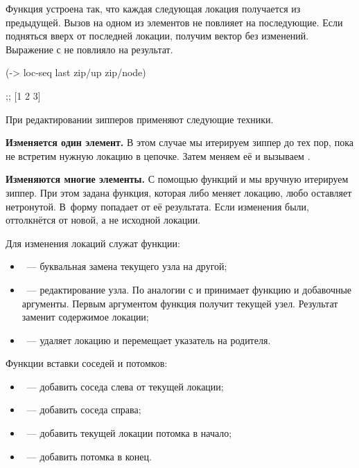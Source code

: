Функция  устроена так, что каждая следующая локация получается из
предыдущей. Вызов  на одном из элементов не повлияет на
последующие. Если подняться вверх от последней локации, получим вектор без
изменений. Выражение с  не повлияло на результат.

\begin{english}
  \begin{clojure}
(-> loc-seq last zip/up zip/node)

;; [1 2 3]
  \end{clojure}
\end{english}

При редактировании зипперов применяют следующие техники.

\textbf{Изменяется один элемент.} В этом случае мы итерируем зиппер до тех пор, пока
не встретим нужную локацию в цепочке. Затем меняем её и вызываем .

\textbf{Изменяются многие элементы.} С помощью функций  и
 мы вручную итерируем зиппер. При этом задана функция, которая
либо меняет локацию, любо оставляет нетронутой. В~форму  попадает
 от её результата. Если изменения были, 
оттолкнётся от новой, а не исходной локации.

\pagebreaklarge


Для изменения локаций служат функции:

\begin{itemize}

\item
  ~--- буквальная замена текущего узла на другой;

\item
  ~--- редактирование узла. По аналогии с  и  принимает
  функцию и добавочные аргументы. Первым аргументом функция получит текущей
  узел. Результат заменит содержимое локации;

\item
  ~--- удаляет локацию и перемещает указатель на родителя.

\end{itemize}


Функции вставки соседей и потомков:

\begin{itemize}

\item
  ~--- добавить соседа слева от текущей локации;

\item
  ~--- добавить соседа справа;

\item
  ~--- добавить текущей локации потомка в начало;

\item
  ~--- добавить потомка в конец.

\end{itemize}

